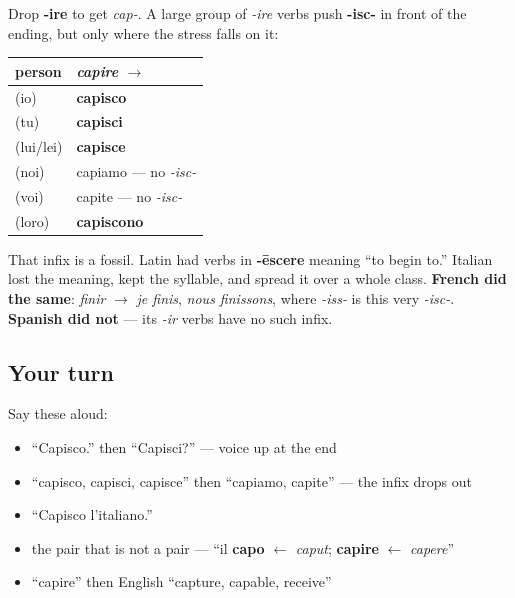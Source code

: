 \begin{grammarlens}[title={Grammar Lens: the -isc- family}]
Drop \textbf{-ire} to get \emph{cap-}. A large group of \emph{-ire} verbs push \textbf{-isc-} in front of the ending, but only where the stress falls on it:

\noindent
\begin{tabularx}{\linewidth}{@{}>{\raggedright\arraybackslash}X>{\raggedright\arraybackslash}X@{}}
\toprule
\textbf{person} & \textbf{\emph{capire} $\to$} \\
\midrule
(io) & \textbf{capisco} \\
(tu) & \textbf{capisci} \\
(lui/lei) & \textbf{capisce} \\
(noi) & capiamo — no \emph{-isc-} \\
(voi) & capite — no \emph{-isc-} \\
(loro) & \textbf{capiscono} \\
\bottomrule
\end{tabularx}

That infix is a fossil. Latin had verbs in \textbf{-ēscere} meaning \textquotedblleft{}to begin to.\textquotedblright{} Italian lost the meaning, kept the syllable, and spread it over a whole class. \textbf{French did the same}: \emph{finir} $\to$ \emph{je finis}, \emph{nous finissons}, where \emph{-iss-} is this very \emph{-isc-}. \textbf{Spanish did not} — its \emph{-ir} verbs have no such infix.
\end{grammarlens}

\subsection*{Your turn}
Say these aloud:

\begin{itemize}
\raggedright
  \item \textquotedblleft{}Capisco.\textquotedblright{} then \textquotedblleft{}Capisci?\textquotedblright{} — voice up at the end
  \item \textquotedblleft{}capisco, capisci, capisce\textquotedblright{} then \textquotedblleft{}capiamo, capite\textquotedblright{} — the infix drops out
  \item \textquotedblleft{}Capisco l'italiano.\textquotedblright{}
  \item the pair that is not a pair — \textquotedblleft{}il \textbf{capo} $\leftarrow$ \emph{caput}; \textbf{capire} $\leftarrow$ \emph{capere}\textquotedblright{}
  \item \textquotedblleft{}capire\textquotedblright{} then English \textquotedblleft{}capture, capable, receive\textquotedblright{}
\end{itemize}

